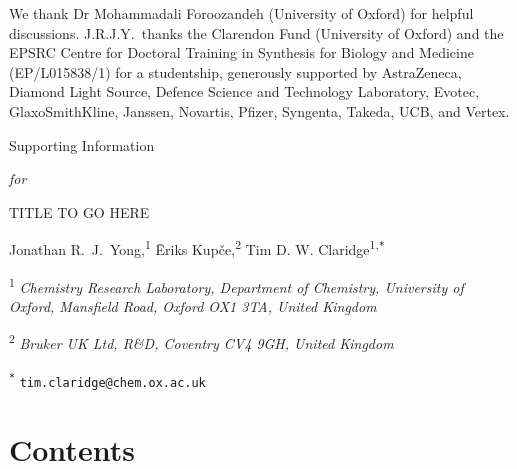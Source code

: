 \documentclass[a4paper,12pt]{article}
\newcommand{\me}{Jonathan R.\ J.\ Yong}
\newcommand{\meshort}{J.R.J.Y.}
\newcommand{\eriks}{{\=E}riks Kup{\v{c}}e}
\newcommand{\tim}{Tim D. W. Claridge}
\newcommand{\articletitle}{TITLE TO GO HERE}
\newcommand{\crl}{Chemistry Research Laboratory, Department of Chemistry, University of Oxford, Mansfield Road, Oxford OX1 3TA, United Kingdom}
\newcommand{\brukeruk}{Bruker UK Ltd, R\&D, Coventry CV4 9GH, United Kingdom}
\begin{document}
\begin{refsection}
We thank Dr Mohammadali Foroozandeh (University of Oxford) for helpful discussions.
\meshort{}\ thanks the Clarendon Fund (University of Oxford) and the EPSRC Centre for Doctoral Training in Synthesis for Biology and Medicine (EP/L015838/1) for a studentship, generously supported by AstraZeneca, Diamond Light Source, Defence Science and Technology Laboratory, Evotec, GlaxoSmithKline, Janssen, Novartis, Pfizer, Syngenta, Takeda, UCB, and Vertex.

\AtNextBibliography{\small}
\printbibliography{}
\end{refsection}



\clearpage
\begin{refsection}
\newcommand{\sectionbreak}{\clearpage}
\renewcommand*{\thefigure}{S\arabic{figure}}
\renewcommand*{\thesection}{S\arabic{section}}
\renewcommand*{\thetable}{S\arabic{table}}
\renewcommand*{\thepage}{S\arabic{page}}
\setcounter{page}{1}
\setcounter{figure}{0}
\setcounter{section}{0}
\setcounter{table}{0}
\onehalfspacing

\hspace{0pt}
\vfill
\begin{center}
    \huge
    Supporting Information

    \vspace{0.3cm}

    \textit{for}

    \vspace{0.3cm}

    \articletitle{}

    \vspace{0.6cm}

    \Large \me{},\textsuperscript{1} \eriks{},\textsuperscript{2} \tim{}\textsuperscript{1,\texttt{*}}

    \vspace{0.6cm}

    \large \textsuperscript{1} \textit{\crl{}}

    \textsuperscript{2} \textit{\brukeruk{}}

    \textsuperscript{\texttt{*}} \texttt{tim.claridge@chem.ox.ac.uk}

\end{center}
\vfill

\newpage
\section*{Contents}


\end{refsection}
\end{document}
